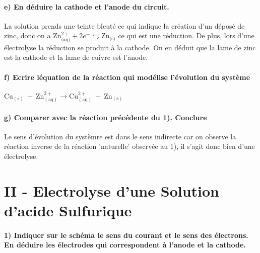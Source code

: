 \documentclass[a4paper, 12pt]{scrartcl}
\begin{document}
\paragraph*{e) En déduire la cathode et l'anode du circuit. \\[5mm]}

La solution prends une teinte bleuté ce qui indique la création d'un déposé de zinc, donc on a 
$\text{Zn}^{2+}_{\text{(aq)}} + 2e^- \leftrightharpoons \text{Zn}_{\text{(s)}}$ ce qui est une réduction. 
De plus, lors d'une électrolyse la réduction se produit à la cathode. On en déduit que la lame de zinc est la cathode et la lame de cuivre est l'anode.

\paragraph*{f) Ecrire léquation de la réaction qui modélise l'évolution du système \\[5mm]}

$\text{Cu}_{(\text{s})}\ +\ \text{Zn}^{2+}_{(\text{aq})} \longrightarrow \text{Cu}^{2+}_{(\text{aq})}\ +\ \text{Zn}_{(\text{s})}$

\paragraph*{g) Comparer avec la réaction précédente du 1). Conclure \\[5mm]}

Le sens d'évolution du systèmre est dans le sens indirecte car on observe la réaction inverse de la réaction 'naturelle' observée au 1), 
il s'agit donc bien d'une électrolyse.



\section*{II - Electrolyse d'une Solution d'acide Sulfurique}
\paragraph*{1) Indiquer sur le schéma le sens du courant et le sens des électrons. En déduire les électrodes qui correspondent à l'anode et la cathode. \\[5mm]}
\end{document}
